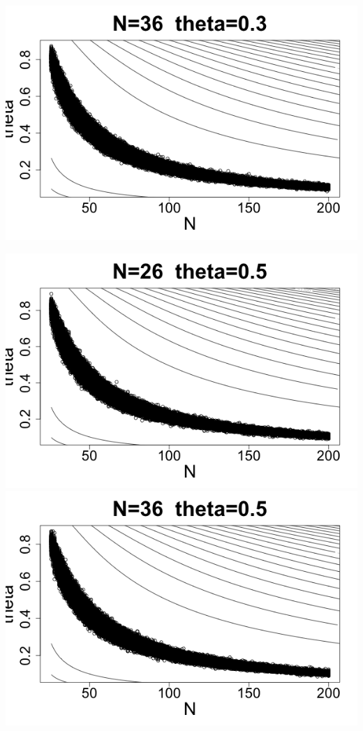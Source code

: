 \documentclass[letterpaper,10pt]{amsart}
\begin{document}
\begin{enumerate}[{1}.1]
\begin{center}
\includegraphics[scale=0.25]{Stat221Impala7.png}
\end{center}
\begin{center}
\includegraphics[scale=0.25]{Stat221Impala3.png}
\includegraphics[scale=0.25]{Stat221Impala8.png}

\end{center}
\end{enumerate}
\end{document}
